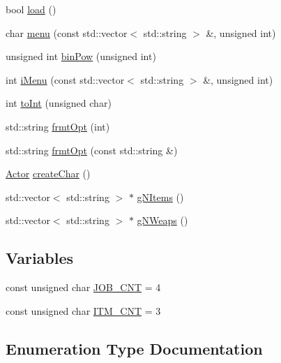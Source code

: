 \begin{DoxyCompactItemize}
\item 
bool \hyperlink{namespace_flow_a75ea47a1fbf09512d617570cce2eeb4e}{load} ()
\item 
char \hyperlink{namespace_flow_aad435346322f19794b3bf501e15ada95}{menu} (const std\+::vector$<$ std\+::string $>$ \&, unsigned int)
\item 
unsigned int \hyperlink{namespace_flow_ab9b34b787aeb9532233f97e20c4b2bf3}{bin\+Pow} (unsigned int)
\item 
int \hyperlink{namespace_flow_aaa39f5888b9d17b0fc04dda6c45456b6}{i\+Menu} (const std\+::vector$<$ std\+::string $>$ \&, unsigned int)
\item 
int \hyperlink{namespace_flow_ae3e1a43d90e5f89f9ea0e5810a499d2b}{to\+Int} (unsigned char)
\item 
std\+::string \hyperlink{namespace_flow_ac5fc50f86c5fa7345f2ef52daa16c086}{frmt\+Opt} (int)
\item 
std\+::string \hyperlink{namespace_flow_a6b0b50aaa0c160e4c79cfcaea58010db}{frmt\+Opt} (const std\+::string \&)
\item 
\hyperlink{class_flow_1_1_actor}{Actor} \hyperlink{namespace_flow_abe71679482e53f77d3dabbf951405ff3}{create\+Char} ()
\item 
std\+::vector$<$ std\+::string $>$ $\ast$ \hyperlink{namespace_flow_ac4033be4d707677351bc7353a173c2e6}{g\+N\+Items} ()
\item 
std\+::vector$<$ std\+::string $>$ $\ast$ \hyperlink{namespace_flow_a3b1a019f8216981627fc188d1f0158b2}{g\+N\+Weaps} ()
\end{DoxyCompactItemize}
\subsection*{Variables}
\begin{DoxyCompactItemize}
\item 
const unsigned char \hyperlink{namespace_flow_abc8632eea1ea1050e9fc2f70cba06fb8}{J\+O\+B\+\_\+\+C\+NT} = 4
\item 
const unsigned char \hyperlink{namespace_flow_a185ca6f187c8d738b91552fe9a987dc6}{I\+T\+M\+\_\+\+C\+NT} = 3
\end{DoxyCompactItemize}


\subsection{Enumeration Type Documentation}
\hypertarget{namespace_flow_ab521722c5aec75faa5be9c5ccfff33d6}{}\label{namespace_flow_ab521722c5aec75faa5be9c5ccfff33d6} 
